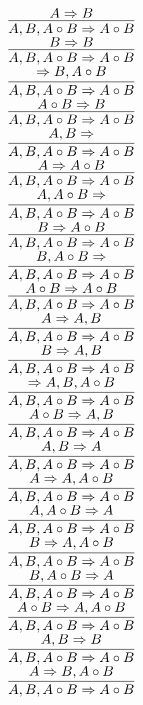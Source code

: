 \documentclass[11pt]{article}
\begin{document}
\begin{center}
\bigskip
\\$\infer{A, B, A\circ B\Rightarrow A\circ B}{A\Rightarrow B}$
\bigskip
\\$\infer{A, B, A\circ B\Rightarrow A\circ B}{B\Rightarrow B}$
\bigskip
\\$\infer{A, B, A\circ B\Rightarrow A\circ B}{\Rightarrow B, A\circ B}$
\bigskip
\\$\infer{A, B, A\circ B\Rightarrow A\circ B}{A\circ B\Rightarrow B}$
\bigskip
\\$\infer{A, B, A\circ B\Rightarrow A\circ B}{A, B\Rightarrow }$
\bigskip
\\$\infer{A, B, A\circ B\Rightarrow A\circ B}{A\Rightarrow A\circ B}$
\bigskip
\\$\infer{A, B, A\circ B\Rightarrow A\circ B}{A, A\circ B\Rightarrow }$
\bigskip
\\$\infer{A, B, A\circ B\Rightarrow A\circ B}{B\Rightarrow A\circ B}$
\bigskip
\\$\infer{A, B, A\circ B\Rightarrow A\circ B}{B, A\circ B\Rightarrow }$
\bigskip
\\$\infer{A, B, A\circ B\Rightarrow A\circ B}{A\circ B\Rightarrow A\circ B}$
\bigskip
\\$\infer{A, B, A\circ B\Rightarrow A\circ B}{A\Rightarrow A, B}$
\bigskip
\\$\infer{A, B, A\circ B\Rightarrow A\circ B}{B\Rightarrow A, B}$
\bigskip
\\$\infer{A, B, A\circ B\Rightarrow A\circ B}{\Rightarrow A, B, A\circ B}$
\bigskip
\\$\infer{A, B, A\circ B\Rightarrow A\circ B}{A\circ B\Rightarrow A, B}$
\bigskip
\\$\infer{A, B, A\circ B\Rightarrow A\circ B}{A, B\Rightarrow A}$
\bigskip
\\$\infer{A, B, A\circ B\Rightarrow A\circ B}{A\Rightarrow A, A\circ B}$
\bigskip
\\$\infer{A, B, A\circ B\Rightarrow A\circ B}{A, A\circ B\Rightarrow A}$
\bigskip
\\$\infer{A, B, A\circ B\Rightarrow A\circ B}{B\Rightarrow A, A\circ B}$
\bigskip
\\$\infer{A, B, A\circ B\Rightarrow A\circ B}{B, A\circ B\Rightarrow A}$
\bigskip
\\$\infer{A, B, A\circ B\Rightarrow A\circ B}{A\circ B\Rightarrow A, A\circ B}$
\bigskip
\\$\infer{A, B, A\circ B\Rightarrow A\circ B}{A, B\Rightarrow B}$
\bigskip
\\$\infer{A, B, A\circ B\Rightarrow A\circ B}{A\Rightarrow B, A\circ B}$

\end{center}
\end{document}
